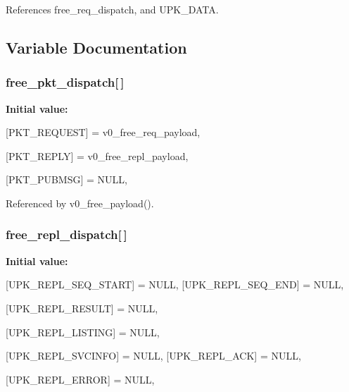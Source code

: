 References free\_\-req\_\-dispatch, and UPK\_\-DATA.



\subsection{Variable Documentation}
\subsubsection[{free\_\-pkt\_\-dispatch}]{ {\bf free\_\-pkt\_\-dispatch}[$\,$]\hspace{0.3cm}{\ttfamily  [static]}}\label{upk__v0__protocol_8c_a089e008a6188d8b5335062e1bb7e3bfc}
{\bfseries Initial value:}
\begin{DoxyCode}
 {
    [PKT_REQUEST] = v0_free_req_payload,
    
    [PKT_REPLY] = v0_free_repl_payload,
    
    [PKT_PUBMSG] = NULL,
}
\end{DoxyCode}


Referenced by v0\_\-free\_\-payload().

\subsubsection[{free\_\-repl\_\-dispatch}]{ {\bf free\_\-repl\_\-dispatch}[$\,$]\hspace{0.3cm}{\ttfamily  [static]}}\label{upk__v0__protocol_8c_a1abf93e0a342eb204459fbad7ba034f0}
{\bfseries Initial value:}
\begin{DoxyCode}
 {
    [UPK_REPL_SEQ_START] = NULL,
    [UPK_REPL_SEQ_END] = NULL,
    
    [UPK_REPL_RESULT] = NULL,
    
    [UPK_REPL_LISTING] = NULL,
    
    [UPK_REPL_SVCINFO] = NULL,
    [UPK_REPL_ACK] = NULL,
    
    [UPK_REPL_ERROR] = NULL,
}
\end{DoxyCode}


